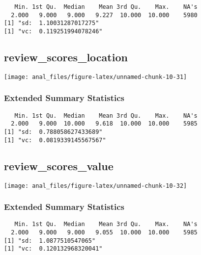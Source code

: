 \begin{verbatim}   Min. 1st Qu.  Median    Mean 3rd Qu.    Max.    NA's 
  2.000   9.000   9.000   9.227  10.000  10.000    5980 
[1] "sd:  1.10031287017275"
[1] "vc:  0.119251994078246"
\end{verbatim}

\pagebreak

\hypertarget{review_scores_location}{%
\subsection{review\_scores\_location}\label{review_scores_location}}

\begin{center}\texttt{[image: anal\_files/figure-latex/unnamed-chunk-10-31]} \end{center}

\hypertarget{extended-summary-statistics-17}{%
\subsubsection{Extended Summary
Statistics}\label{extended-summary-statistics-17}}

\begin{verbatim}   Min. 1st Qu.  Median    Mean 3rd Qu.    Max.    NA's 
  2.000   9.000  10.000   9.618  10.000  10.000    5985 
[1] "sd:  0.788058627433689"
[1] "vc:  0.0819339145567567"
\end{verbatim}

\pagebreak

\hypertarget{review_scores_value}{%
\subsection{review\_scores\_value}\label{review_scores_value}}

\begin{center}\texttt{[image: anal\_files/figure-latex/unnamed-chunk-10-32]} \end{center}

\hypertarget{extended-summary-statistics-18}{%
\subsubsection{Extended Summary
Statistics}\label{extended-summary-statistics-18}}

\begin{verbatim}   Min. 1st Qu.  Median    Mean 3rd Qu.    Max.    NA's 
  2.000   9.000   9.000   9.055  10.000  10.000    5985 
[1] "sd:  1.0877510547065"
[1] "vc:  0.120132968320041"
\end{verbatim}

